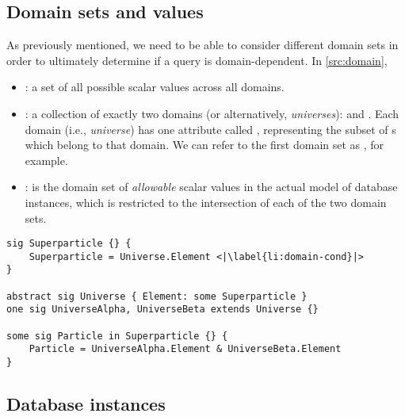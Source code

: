 \subsection{Domain sets and values}

As previously mentioned, we need to be able to consider different domain sets in order to ultimately determine if a query is domain-dependent. In \autoref{src:domain},

\begin{itemize}[topsep=0.5pc,itemsep=0.25pc]
    \item  \textbf{}:\; a set of all possible scalar values across all domains.
    \item  \textbf{}:\; a collection of exactly two domains (or alternatively, \emph{universes}):  and . \; Each domain (i.e., \emph{universe}) has one attribute called , representing the subset of s which belong to that domain. We can refer to the first domain set as , for example.
    \item  \textbf{}:\; is the domain set of \emph{allowable} scalar values in the actual model of database instances, which is restricted to the intersection of each of the two domain sets.
\end{itemize}

\begin{lstlisting}[language=alloy,float=t,caption={Alloy model signature for domain sets (\emph{universes}) and their elements (\emph{particles}). This stencil code will always be present in all Alloy models. The fact assert on \autoref{li:domain-cond} ensures that each \alloy{Superparticle} must be present in at least one domain, for the sake of conciseness of models generated by Alloy.},label={src:domain}]
sig Superparticle {} {
	Superparticle = Universe.Element <|\label{li:domain-cond}|>
}

abstract sig Universe { Element: some Superparticle }
one sig UniverseAlpha, UniverseBeta extends Universe {}

some sig Particle in Superparticle {} {
	Particle = UniverseAlpha.Element & UniverseBeta.Element
}
\end{lstlisting}


\subsection{Database instances}

